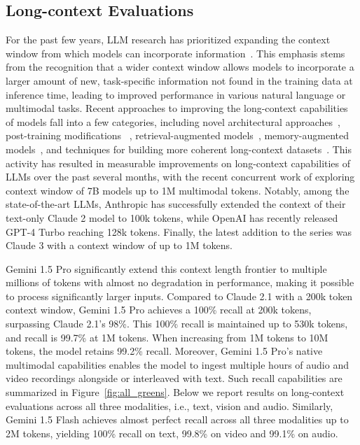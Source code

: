 \subsection{Long-context Evaluations}

For the past few years, LLM research has prioritized expanding the context window from which models can incorporate information~\cite{claude, gpt4}. This emphasis stems from the recognition that a wider context window allows models to incorporate a larger amount of new, task-specific information not found in the training data at inference time, leading to improved performance in various natural language or multimodal tasks. Recent approaches to improving the long-context capabilities of models fall into a few categories, including novel architectural approaches~\cite{zaheer2020big, guo2021longt5, ainslie2023colt5, orvieto2023resurrecting, gu2023mamba}, post-training modifications ~\cite{press2021train, xiong2023effective, bertsch2023unlimiformer, chen2023longlora}, retrieval-augmented models~\cite{pmlr-v119-guu20a, karpukhin2020dense, santhanam2021colbertv2, izacard2022few, jiang-etal-2022-retrieval}, memory-augmented models~\cite{wu2022memorizing, zhong-etal-2022-training, bulatov2022recurrent, wu-etal-2022-memformer, martins-etal-2022-former, mu2023learning, bulatov2023scaling}, and techniques for building more coherent long-context datasets~\cite{shi2023context, staniszewski2023structured}. This activity has resulted in measurable improvements on long-context capabilities of LLMs over the past several months, with the recent concurrent work of \citet{liu2024world} exploring context window of 7B models up to 1M multimodal tokens. Notably, among the state-of-the-art LLMs, Anthropic has successfully extended the context of their text-only Claude 2 model to 100k tokens, while OpenAI has recently released GPT-4 Turbo reaching 128k tokens. Finally, the latest addition to the series was Claude 3 with a context window of up to 1M tokens.

Gemini 1.5 Pro significantly extend this context length frontier to multiple millions of tokens with almost no degradation in performance, making it possible to process significantly larger inputs. Compared to Claude 2.1 with a 200k token context window, Gemini 1.5 Pro achieves a 100\% recall at 200k tokens, surpassing Claude 2.1's 98\%. This 100\% recall is maintained up to 530k tokens, and recall is 99.7\% at 1M tokens. When increasing from 1M tokens to 10M tokens, the model retains 99.2\% recall. Moreover, Gemini 1.5 Pro’s native multimodal capabilities enables the model to ingest multiple hours of audio and video recordings alongside or interleaved with text. Such recall capabilities are summarized in Figure~\ref{fig:all_greens}.
Below we report results on long-context evaluations across all three modalities, i.e., text, vision and audio. Similarly, Gemini 1.5 Flash achieves almost perfect recall across all three modalities up to 2M tokens, yielding 100\% recall on text, 99.8\% on video and 99.1\% on audio.

